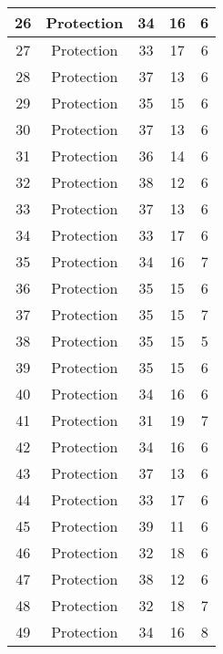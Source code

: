 \documentclass[results.tex]{subfiles}
\begin{document}
\begin{center}
\begin{tabular}{| c || c | c | c | c |}
    \hline
    26 & Protection & 34 & 16 & 6 \\ 
    \hline
    27 & Protection & 33 & 17 & 6 \\ 
    \hline
    28 & Protection & 37 & 13 & 6 \\ 
    \hline
    29 & Protection & 35 & 15 & 6 \\ 
    \hline
    30 & Protection & 37 & 13 & 6 \\ 
    \hline
    31 & Protection & 36 & 14 & 6 \\ 
    \hline
    32 & Protection & 38 & 12 & 6 \\ 
    \hline
    33 & Protection & 37 & 13 & 6 \\ 
    \hline
    34 & Protection & 33 & 17 & 6 \\ 
    \hline
    35 & Protection & 34 & 16 & 7 \\ 
    \hline
    36 & Protection & 35 & 15 & 6 \\ 
    \hline
    37 & Protection & 35 & 15 & 7 \\ 
    \hline
    38 & Protection & 35 & 15 & 5 \\ 
    \hline
    39 & Protection & 35 & 15 & 6 \\ 
    \hline
    40 & Protection & 34 & 16 & 6 \\ 
    \hline
    41 & Protection & 31 & 19 & 7 \\ 
    \hline
    42 & Protection & 34 & 16 & 6 \\ 
    \hline
    43 & Protection & 37 & 13 & 6 \\ 
    \hline
    44 & Protection & 33 & 17 & 6 \\ 
    \hline
    45 & Protection & 39 & 11 & 6 \\ 
    \hline
    46 & Protection & 32 & 18 & 6 \\ 
    \hline
    47 & Protection & 38 & 12 & 6 \\ 
    \hline
    48 & Protection & 32 & 18 & 7 \\ 
    \hline
    49 & Protection & 34 & 16 & 8 \\ 
    \hline   \end{tabular}
\end{center}
\end{document}
